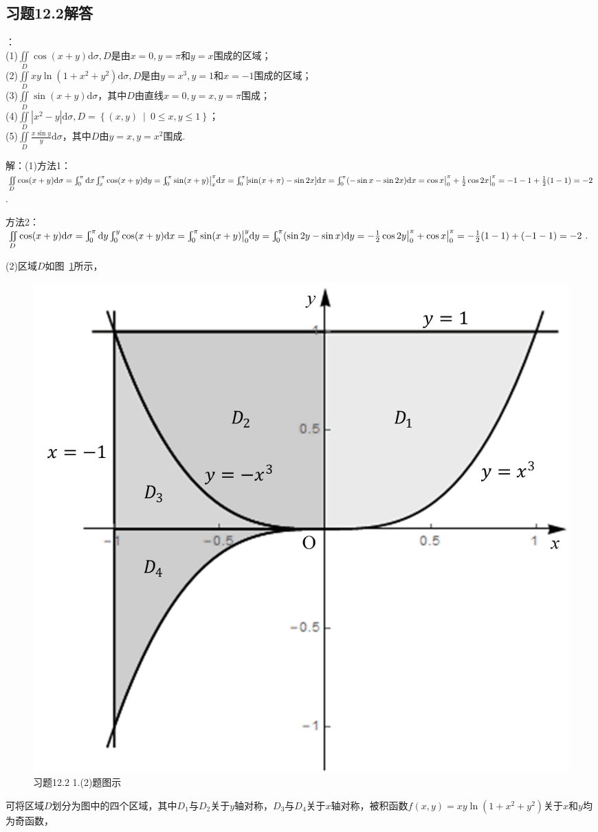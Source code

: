 \documentclass[12pt,UTF8]{ctexart}
\newcommand\Set[2]{\left\{#1\ \middle\vert\ #2 \right\}}
\newcommand{\Int}[4]{\varint\nolimits_{#1}^{#2}#3\mathrm d#4}
\newcommand{\aIInt}[1]{\iint\limits_{#1}}
\begin{document}
\subsection{习题12.2解答}
\begin{enumerate}
：\\
(1)$\aIInt{D}\cos(x+y)\mathrm d\sigma,D$是由$x=0,y=\pi$和$y=x$围成的区域；\\
(2)$\aIInt{D}xy\ln(1+x^2+y^2)\mathrm d\sigma,D$是由$y=x^3,y=1$和$x=-1$围成的区域；\\
(3)$\aIInt{D}\sin(x+y)\mathrm d\sigma$，其中$D$由直线$x=0,y=x,y=\pi$围成；\\
(4)$\aIInt{D}|x^2-y|\mathrm d\sigma,D=\Set{(x,y)}{0\leqslant x,y\leqslant1}$；\\
(5)$\aIInt{D}\frac{x\sin y}y\mathrm d\sigma$，其中$D$由$y=x,y=x^2$围成.

解：(1)方法1：$\aIInt{D}\cos(x+y)\mathrm d\sigma=\Int{0}{\pi}{}{x}\Int{x}{\pi}{\cos(x+y)}{y}=\Int{0}{\pi}{\sin(x+y)\big|_x^\pi}{x}\\
=\Int{0}{\pi}{[\sin(x+\pi)-\sin2x]}{x}=\Int{0}{\pi}{(-\sin x-\sin2x)}{x}=\cos x\big|_0^\pi+\frac12\cos2x\big|_0^\pi\\
=-1-1+\frac12(1-1)=-2$.

方法2：$\aIInt{D}\cos(x+y)\mathrm d\sigma=\Int{0}{\pi}{}{y}\Int{0}{y}{\cos(x+y)}{x}=\Int{0}{\pi}{\sin(x+y)\big|_0^y}{y}\\
=\Int{0}{\pi}{(\sin2y-\sin x)}{y}=-\frac12\cos2y\big|_0^\pi+\cos x\big|_0^\pi=-\frac12(1-1)+(-1-1)=-2$.

(2)区域$D$如图~\ref{12-2-1-2}所示，
\begin{figure}[H]
\begin{center}
\includegraphics[height=0.3\textheight]{Figures/Fig12-2-1-2.png}
\end{center}
\caption{习题12.2 1.(2)题图示}
\label{12-2-1-2}
\end{figure}
可将区域$D$划分为图中的四个区域，其中$D_1$与$D_2$关于$y$轴对称，$D_3$与$D_4$关于$x$轴对称，被积函数$f(x,y)=xy\ln(1+x^2+y^2)$关于$x$和$y$均为奇函数，


\end{enumerate}
\end{document}

